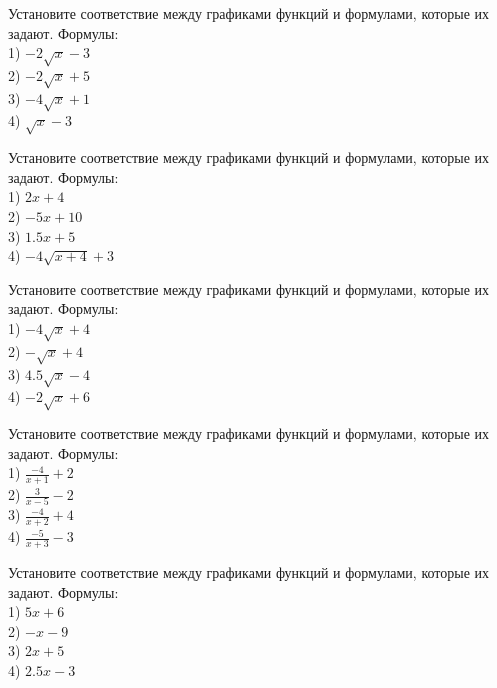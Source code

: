 \documentclass[4apaper]{article}
\begin{document}
\begin{taskBN}{54}
Установите соответствие между графиками функций и формулами, которые их задают. Формулы: \\1) $-2\sqrt{x}-3$\\2) $-2\sqrt{x}+5$\\3) $-4\sqrt{x}+1$\\4) $\sqrt{x}-3$
\end{taskBN}

\begin{taskBN}{55}
Установите соответствие между графиками функций и формулами, которые их задают. Формулы: \\1) $2x+4$\\2) $-5x+10$\\3) $1.5x+5$\\4) $-4\sqrt{x+4}+3$
\end{taskBN}

\begin{taskBN}{56}
Установите соответствие между графиками функций и формулами, которые их задают. Формулы: \\1) $-4\sqrt{x}+4$\\2) $-\sqrt{x}+4$\\3) $4.5\sqrt{x}-4$\\4) $-2\sqrt{x}+6$
\end{taskBN}

\begin{taskBN}{57}
Установите соответствие между графиками функций и формулами, которые их задают. Формулы: \\1) $\frac{-4}{x+1}+2$\\2) $\frac{3}{x-5}-2$\\3) $\frac{-4}{x+2}+4$\\4) $\frac{-5}{x+3}-3$
\end{taskBN}

\begin{taskBN}{58}
Установите соответствие между графиками функций и формулами, которые их задают. Формулы: \\1) $5x+6$\\2) $-x-9$\\3) $2x+5$\\4) $2.5x-3$
\end{taskBN}
\end{document}
